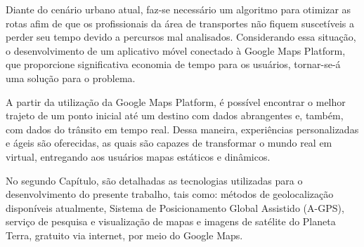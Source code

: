 
Diante do cenário urbano atual, faz-se necessário um algoritmo para otimizar as rotas afim de que os profissionais da área de transportes não fiquem suscetíveis a perder seu tempo devido a percursos mal analisados. Considerando essa situação, o desenvolvimento de um aplicativo móvel conectado à Google Maps Platform, que proporcione significativa economia de tempo para os usuários, tornar-se-á uma solução para o problema.


A partir da utilização da Google Maps Platform, é possível encontrar o melhor trajeto de um ponto inicial até um destino com dados abrangentes e, também, com dados do trânsito em tempo real. Dessa maneira, experiências personalizadas e ágeis são oferecidas, as quais são capazes de transformar o mundo real em virtual, entregando aos usuários mapas estáticos e dinâmicos. 


No segundo Capítulo, são detalhadas as tecnologias utilizadas para o desenvolvimento do presente trabalho, tais como: métodos de geolocalização disponíveis atualmente, Sistema de Posicionamento Global Assistido (A-GPS), serviço de pesquisa e visualização de mapas e imagens de satélite do Planeta Terra, gratuito via internet, por meio do Google Maps.

